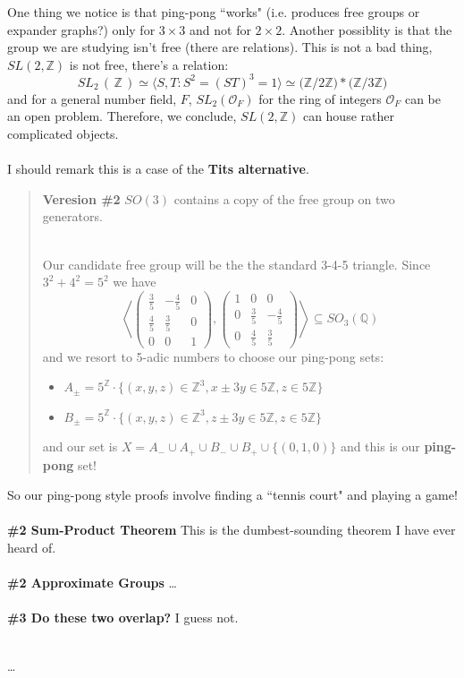 \documentclass[12pt]{article}
\begin{document}
One thing we notice is that ping-pong ``works" (i.e. produces free groups or expander graphs?) only for $3 \times 3$ and not for $2 \times 2$.  Another possiblity is that the group we are studying isn't free (there are relations).  This is not a bad thing, $SL(2, \mathbb{Z})$ is not free, there's a relation:
$$ SL_2\,(\, \mathbb{Z}\,) \simeq \big\langle S, T: S^2 = (ST)^3 = 1 \big\rangle \simeq \big( \mathbb{Z}/2\mathbb{Z} \big) \ast \big( \mathbb{Z}/3\mathbb{Z} \big) $$
and for a general number field, $F$, $SL_2( \mathcal{O}_F)$ for the ring of integers $\mathcal{O}_F$ can be an open problem.  Therefore, we conclude, $SL(2, \mathbb{Z})$ can house rather complicated objects. \\ \\
I should remark this is a case of the \textbf{Tits alternative}. 
\begin{quotation}\noindent 
\textbf{\color{red!50!white}Veresion \#2} {\color{green!50!blue}$SO(3)$ contains a copy of the free group on two generators.} \\ \\
{\color{green!60!blue} Our candidate free group will be the the standard 3-4-5 triangle.  Since $3^2 + 4^2 = 5^2$ we have
$$ \left\langle \left(\begin{array}{crc}
\frac{3}{5} & -\frac{4}{5} & 0 \\
\frac{4}{5} & \frac{3}{5} & 0 \\
0 & 0 & 1 \end{array}\right),
\left(\begin{array}{crr}
1 & 0 & 0 \\
0 & \frac{3}{5} & -\frac{4}{5}  \\
0 & \frac{4}{5} & \frac{3}{5}  \end{array}\right) \right\rangle \subseteq SO_3(\mathbb{Q}) $$
and we resort to 5-adic numbers to choose our ping-pong sets:
\begin{itemize}
\item $A_\pm= 5^\mathbb{Z} \cdot \{ (x,y,z) \in \mathbb{Z}^3, x \pm 3y \in 5 \mathbb{Z} ,  z \in 5 \mathbb{Z}  \}$
\item $B_\pm = 5^\mathbb{Z} \cdot \{ (x,y,z) \in \mathbb{Z}^3, z \pm 3y \in 5 \mathbb{Z} ,  z \in 5 \mathbb{Z}  \}$
\end{itemize}
and our set is $X =A_- \cup A_+ \cup B_- \cup B_+ \cup \{ (0,1,0)\} $ and this is our \textbf{ping-pong} set!
}\end{quotation} 
So our ping-pong style proofs involve finding a ``tennis court" and playing a game! \\\\
\textbf{\#2 Sum-Product Theorem}  This is the dumbest-sounding theorem I have ever heard of. \\ \\
\textbf{\#2 Approximate Groups} \dots \\ \\
\textbf{\#3 Do these two overlap?} I guess not. \\ \\

\vfill

\begin{thebibliography}{}

\item \dots

\end{thebibliography}
\end{document}
